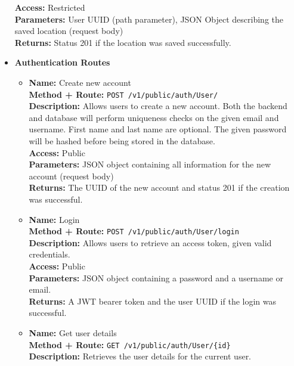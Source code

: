\begin{itemize}
{\begin{itemize}
{        \textbf{Access:} Restricted\\
        \textbf{Parameters:} User UUID (path parameter), JSON Object describing
        the saved location (request body)\\
        \textbf{Returns:} Status 201 if the location was saved successfully.\\
      }
    \end{itemize}
  }
  \item{
    \textbf{Authentication Routes}
    \begin{itemize}
      \item {
        \textbf{Name:} Create new account\\
        \textbf{Method + Route:} \texttt{POST /v1/public/auth/User/}\\
        \textbf{Description:} Allows users to create a new account. Both the
        backend and database will perform uniqueness checks on the given email
        and username. First name and last name are optional. The given password
        will be hashed before being stored in the database.\\
        \textbf{Access:} Public\\
        \textbf{Parameters:} JSON object containing all information for the new
        account (request body)\\
        \textbf{Returns:} The UUID of the new account and status 201 if the
        creation was successful.\\
      }
      \item {
        \textbf{Name:} Login\\
        \textbf{Method + Route:} \texttt{POST /v1/public/auth/User/login}\\
        \textbf{Description:} Allows users to retrieve an access token, given
        valid credentials.\\
        \textbf{Access:} Public\\
        \textbf{Parameters:} JSON object containing a password and a username or
        email.\\
        \textbf{Returns:} A JWT bearer token and the user UUID if the login was
        successful.\\
      }
      \item {
        \textbf{Name:} Get user details\\
        \textbf{Method + Route:} \texttt{GET /v1/public/auth/User/\{id\}}\\
        \textbf{Description:} Retrieves the user details for the current user.
}
\end{itemize}}
\end{itemize}
